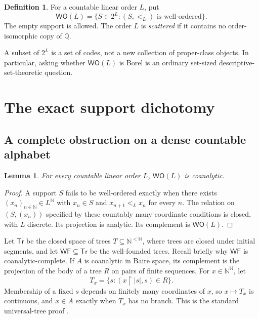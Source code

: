 \documentclass[11pt]{article}
\numberwithin{equation}{section}
\newtheorem{lemma}[lemma]{Lemma}
\theoremstyle{definition}
\newtheorem{definition}[definition]{Definition}
\theoremstyle{remark}
\newcommand{\N}{\mathbb N}
\newcommand{\Q}{\mathbb Q}
\newcommand{\WO}{\mathsf{WO}}
\newcommand{\WF}{\mathsf{WF}}
\newcommand{\Tr}{\mathsf{Tr}}
\begin{document}
\begin{definition}
For a countable linear order $L$, put
\[
 \WO(L)=\{S\in2^L:(S,<_{L})\text{ is well-ordered}\}.
\]
The empty support is allowed. The order $L$ is \emph{scattered} if it contains
no order-isomorphic copy of $\Q$.
\end{definition}

A subset of $2^L$ is a set of codes, not a new collection of proper-class
objects. In particular, asking whether $\WO(L)$ is Borel is an ordinary
set-sized descriptive-set-theoretic question.

\section{The exact support dichotomy}
\label{pma:bor:sec:order}

\subsection{A complete obstruction on a dense countable alphabet}

\begin{lemma}
\label{pma:bor:lem:coanalytic}
For every countable linear order $L$, $\WO(L)$ is coanalytic.
\end{lemma}
\begin{proof}
A support $S$ fails to be well-ordered exactly when there exists
$(x_n)_{n\in\N}\in L^\N$ with $x_n\in S$ and $x_{n+1}<_{L}x_n$ for every
$n$. The relation on $(S,(x_n))$ specified by these countably many coordinate
conditions is closed, with $L$ discrete. Its projection is analytic. Its
complement is $\WO(L)$.
\end{proof}

Let $\Tr$ be the closed space of trees $T\subseteq\N^{<\N}$, where trees
are closed under initial segments, and let $\WF\subseteq\Tr$ be the
well-founded trees. Recall briefly why $\WF$ is coanalytic-complete. If
$A$ is coanalytic in Baire space, its complement is the projection of the body
of a tree $R$ on pairs of finite sequences. For $x\in\N^\N$, let
\[
 T_x=\{s:(x\upharpoonright |s|,s)\in R\}.
\]
Membership of a fixed $s$ depends on finitely many coordinates of $x$, so
$x\mapsto T_x$ is continuous, and $x\in A$ exactly when $T_x$ has no branch.
This is the standard universal-tree proof \cite[Section 16.B]{Tserunyan}.
\end{document}
